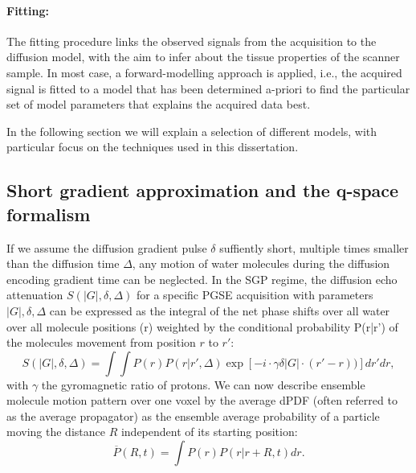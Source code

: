 \paragraph{Fitting:} The fitting procedure links the observed signals from the acquisition to the diffusion model, with the aim to infer about the tissue properties of the scanner sample. In most case, a forward-modelling approach is applied, i.e., the acquired signal is fitted to a model that has been determined a-priori to find the particular set of model parameters that explains the acquired data best.  


In the following section we will explain a selection of different models, with particular focus on the techniques used in this dissertation. 
\subsection{Short gradient approximation and the q-space formalism}
If we assume the diffusion gradient pulse $\delta$ suffiently short, multiple times smaller than the diffusion time $\Delta$, any motion of water molecules during the diffusion encoding gradient time can be neglected. In the SGP regime, the diffusion echo attenuation $S(|G|,\delta,\Delta)$ for a specific PGSE acquisition with parameters $|G|,\delta,\Delta$  can be expressed as the integral of the net phase shifts over all water over all molecule positions (r) weighted by the conditional probability P(r|r') of the molecules movement from position $r$ to $r'$\citep{Callaghan:1991}:
\begin{equation}
	S(|G|,\delta,\Delta)=\int \int P(r)P(r|r',\Delta)\exp[-i\cdot \gamma \delta |G|\cdot (r'-r))] dr'dr,
	\label{eq:chapter2 signal in sgp}
\end{equation}
with $\gamma$ the gyromagnetic ratio of protons. We can now describe ensemble molecule motion pattern over one voxel by the average \gls{dPDF} (often referred to as the average propagator\citep{Karger:1983}) as the ensemble average probability of a particle moving the distance $R$ independent of its starting position:
\begin{equation}
	\overline{P}(R,t)=\int P(r)P(r|r+R,t)dr.
	\label{eq:chapter2 dpdf}
\end{equation}

